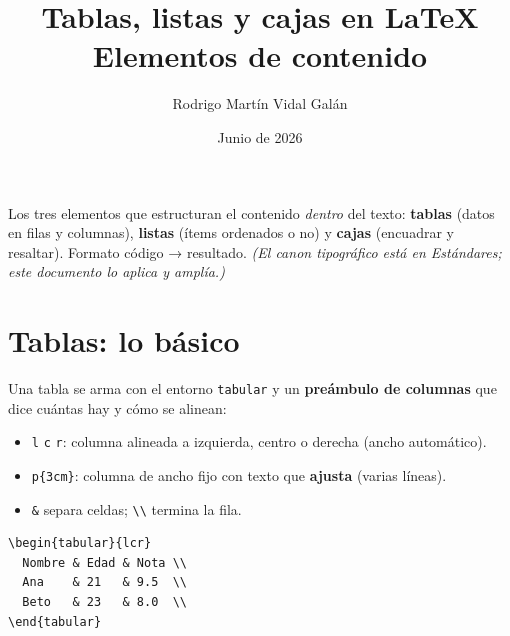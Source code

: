 \documentclass[11pt,a4paper]{article}
\title{\textbf{Tablas, listas y cajas en \LaTeX}\\[2pt]
       \large Elementos de contenido}
\author{Rodrigo Martín Vidal Galán}
\date{Junio de 2026}
\begin{document}
\maketitle

\noindent Los tres elementos que estructuran el contenido \emph{dentro} del
texto: \textbf{tablas} (datos en filas y columnas), \textbf{listas} (ítems
ordenados o no) y \textbf{cajas} (encuadrar y resaltar). Formato código →
resultado. \emph{(El canon tipográfico está en \emph{Estándares}; este documento
lo aplica y amplía.)}

\newpage
\tableofcontents
\newpage

\section{Tablas: lo básico}
Una tabla se arma con el entorno \texttt{tabular} y un \textbf{preámbulo de
columnas} que dice cuántas hay y cómo se alinean:
\begin{itemize}[noitemsep,leftmargin=*]
  \item \texttt{l} \texttt{c} \texttt{r}: columna alineada a izquierda, centro o
        derecha (ancho automático).
  \item \texttt{p\{3cm\}}: columna de ancho fijo con texto que \textbf{ajusta}
        (varias líneas).
  \item \texttt{\&} separa celdas; \texttt{\textbackslash\textbackslash} termina
        la fila.
\end{itemize}
\begin{lstlisting}
\begin{tabular}{lcr}
  Nombre & Edad & Nota \\
  Ana    & 21   & 9.5  \\
  Beto   & 23   & 8.0  \\
\end{tabular}
\end{lstlisting}

\end{document}
